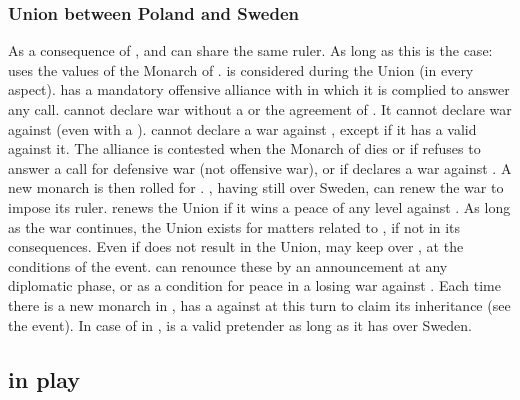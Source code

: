 \subsubsection{Union between Poland and Sweden}
\label{chSpecific:Sweden:Polish Union}
\aparag As a consequence of , \SUE
and \POL can share the same ruler. As long as this is the case:
\bparag \SUE uses the values of the Monarch of \POL. \SUE is considered
 during the Union (in every aspect).
\bparag \SUE has a mandatory offensive alliance with \POL in which it is
complied to answer any call.
\bparag \SUE cannot declare war without a \CB or the agreement of \POL.
It cannot declare war against \POL (even with a \CB).
\bparag \POL cannot declare a war against \SUE, except if it has a valid
\CB against it.
\aparag The alliance is contested when the Monarch of \POL dies or if
\POL refuses to answer a call for defensive war (not offensive war), or
if \POL declares a war against \SUE.
\bparag A new monarch is then rolled for \SUE.
\bparag \POL, having still  over Sweden, can
renew the war to impose its ruler. \POL renews the Union if it wins a
peace of any level against \SUE. As long as the war continues, the Union
exists for matters related to \VP, if not in its consequences.
 Even if 
does not result in the Union, \POL may keep  over
\SUE, at the conditions of the event.
\bparag \POL can renounce these  by an
announcement at any diplomatic phase, or as a condition for peace in a
losing war against \SUE.
\bparag Each time there is a new monarch in \SUE, \POL has a \CB against
\SUE at this turn to claim its inheritance (see the event).
\bparag In case of  in \SUE, \POL is a valid
pretender as long as it has  over Sweden.

\subsection{ in play}
